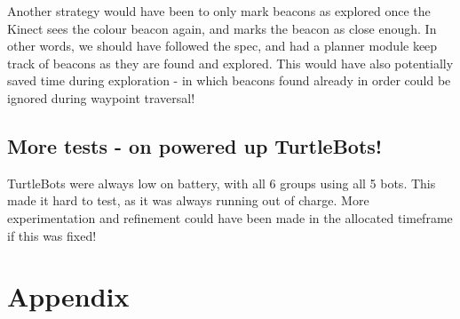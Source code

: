 \documentclass[titlepage,12pt,a4paper]{article}
\begin{document}
Another strategy would have been to only mark beacons as explored once the Kinect sees the colour beacon again, and marks the beacon as close enough. In other words, we should have followed the spec, and had a planner module keep track of beacons as they are found and explored. This would have also potentially saved time during exploration - in which beacons found already in order could be ignored during waypoint traversal!

\subsection*{More tests - on powered up TurtleBots!}
TurtleBots were always low on battery, with all 6 groups using all 5 bots. This made it hard to test, as it was always running out of charge. More experimentation and refinement could have been made in the allocated timeframe if this was fixed!

\pagebreak
\section{Appendix}
\end{document}
